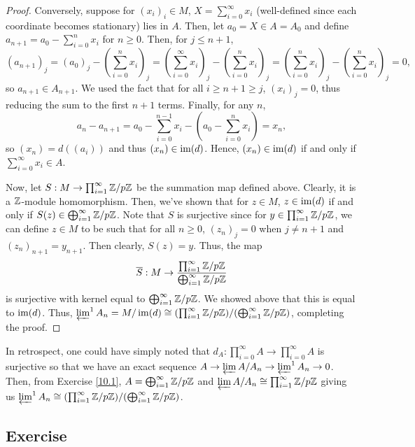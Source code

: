 \begin{proof}
Conversely, suppose for $(x_i)_i \in M$, $X = \sum_{i=0}^{\infty} x_i$ (well-defined since each coordinate becomes stationary) lies in $A$. 
Then, let $a_0 = X \in A = A_0$ and define $a_{n+1} = a_0 - \sum_{i=0}^n x_i$ for $n \ge 0$. Then, for $j \le n+1$,
$$(a_{n+1})_j = (a_0)_j - \left(\sum_{i=0}^n x_i\right)_j = \left(\sum_{i=0}^{\infty} x_i\right)_j - \left(\sum_{i=0}^n x_i\right)_j 
= \left(\sum_{i=0}^n x_i\right)_j - \left(\sum_{i=0}^n x_i\right)_j = 0,$$
so $a_{n+1} \in A_{n+1}$. We used the fact that for all $i \ge n+1 \ge j$, $(x_i)_j = 0$, thus reducing the sum to the first $n+1$ terms.
Finally, for any $n$, 
$$a_n - a_{n+1} = a_0 - \sum_{i=0}^{n-1} x_i - \left(a_0 - \sum_{i=0}^n x_i\right) = x_n,$$
so $(x_n) = d((a_i))$ and thus $(x_n) \in \operatorname{im}(d)$. Hence, $(x_n) \in \operatorname{im}(d)$ if and only if $\sum_{i=0}^{\infty}x_i \in A$.

Now, let $S : M \to \prod_{i=1}^{\infty} \mathbb{Z}/p\mathbb{Z}$ be the summation map defined above. Clearly, it is a $\mathbb{Z}$-module homomorphism. Then, we've shown
that for $z \in M$, $z \in \operatorname{im}(d)$ if and only if $S(z) \in \bigoplus_{i=1}^{\infty} \mathbb{Z}/p\mathbb{Z}$. Note that $S$ is surjective since for $y \in \prod_{i=1}^{\infty} \mathbb{Z}/p\mathbb{Z}$,
we can define $z \in M$ to be such that for all $n \ge 0$, $(z_n)_j = 0$ when $j \neq n+1$ and $(z_n)_{n+1} = y_{n+1}$. Then clearly, $S(z) = y$. Thus, the map
$$\overline{S} : M \to \frac{\prod_{i=1}^{\infty} \mathbb{Z}/p\mathbb{Z}}{\bigoplus_{i=1}^{\infty} \mathbb{Z}/p\mathbb{Z}}$$
is surjective with kernel equal to $\bigoplus_{i=1}^{\infty} \mathbb{Z}/p\mathbb{Z}$. We showed above that this is equal to $\operatorname{im}(d)$. Thus,
$\varprojlim^1 A_n = M/\operatorname{im}(d) \cong (\prod_{i=1}^{\infty} \mathbb{Z}/p\mathbb{Z})/(\bigoplus_{i=1}^{\infty} \mathbb{Z}/p\mathbb{Z})$,
completing the proof.
\end{proof}

\begin{remark}
In retrospect, one could have simply noted that $d_A : \prod_{i=0}^{\infty} A \to \prod_{i=0}^{\infty} A$ is surjective so that we have an exact sequence
$A \to \varprojlim A/A_n \to \varprojlim^1 A_n \to 0$.
Then, from Exercise \ref{10.1}, $A = \bigoplus_{i=1}^{\infty}\mathbb{Z}/p\mathbb{Z}$ and $\varprojlim A/A_n \cong \prod_{i=1}^{\infty}\mathbb{Z}/p\mathbb{Z}$ giving us
$\varprojlim^1 A_n \cong (\prod_{i=1}^{\infty}\mathbb{Z}/p\mathbb{Z})/(\bigoplus_{i=1}^{\infty}\mathbb{Z}/p\mathbb{Z})$.
\end{remark}

\subsection{Exercise}\label{10.3}

